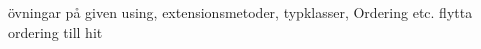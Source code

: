 

\ifPreSolution


\Exercise{\ExeWeekELEVEN}\label{exe:W11}

\TODO övningar på given using, extensionsmetoder, typklasser, Ordering etc.
\TODO flytta ordering till hit

\begin{Goals}
\item \TODO
\end{Goals}

\begin{Preparations}
\item {}
\end{Preparations}

\BasicTasks %

\else

\ExerciseSolution{\ExeWeekELEVEN}

\BasicTasks %

\fi



\QUESTBEGIN

\Task  \what~  \TODO

\Subtask \TODO



\SOLUTION


\TaskSolved \what

\SubtaskSolved  \TODO


\QUESTEND






